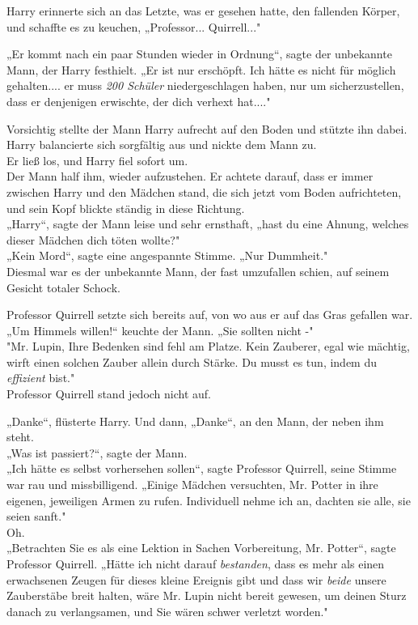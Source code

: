 {Harry erinnerte sich an das Letzte, was er gesehen hatte, den fallenden Körper, und schaffte es zu keuchen, „Professor... Quirrell..."

„Er kommt nach ein paar Stunden wieder in Ordnung“, sagte der unbekannte Mann, der Harry festhielt. „Er ist nur erschöpft. Ich hätte es nicht für möglich gehalten.... er muss \emph{200 Schüler} niedergeschlagen haben, nur um sicherzustellen, dass er denjenigen erwischte, der dich verhext hat...."

Vorsichtig stellte der Mann Harry aufrecht auf den Boden und stützte ihn dabei.\\ Harry balancierte sich sorgfältig aus und nickte dem Mann zu.\\ Er ließ los, und Harry fiel sofort um.\\ Der Mann half ihm, wieder aufzustehen. Er achtete darauf, dass er immer zwischen Harry und den Mädchen stand, die sich jetzt vom Boden aufrichteten, und sein Kopf blickte ständig in diese Richtung.\\ „Harry“, sagte der Mann leise und sehr ernsthaft, „hast du eine Ahnung, welches dieser Mädchen dich töten wollte?"\\ „Kein Mord“, sagte eine angespannte Stimme. „Nur Dummheit."\\ Diesmal war es der unbekannte Mann, der fast umzufallen schien, auf seinem Gesicht totaler Schock.

Professor Quirrell setzte sich bereits auf, von wo aus er auf das Gras gefallen war.\\ „Um Himmels willen!“ keuchte der Mann. „Sie sollten nicht -"\\ "Mr. Lupin, Ihre Bedenken sind fehl am Platze. Kein Zauberer, egal wie mächtig, wirft einen solchen Zauber allein durch Stärke. Du musst es tun, indem du \emph{effizient} bist."\\ Professor Quirrell stand jedoch nicht auf.

„Danke“, flüsterte Harry. Und dann, „Danke“, an den Mann, der neben ihm steht.\\ „Was ist passiert?“, sagte der Mann.\\ „Ich hätte es selbst vorhersehen sollen“, sagte Professor Quirrell, seine Stimme war rau und missbilligend. „Einige Mädchen versuchten, Mr. Potter in ihre eigenen, jeweiligen Armen zu rufen. Individuell nehme ich an, dachten sie alle, sie seien sanft."\\ Oh.\\ „Betrachten Sie es als eine Lektion in Sachen Vorbereitung, Mr. Potter“, sagte Professor Quirrell. „Hätte ich nicht darauf \emph{bestanden}, dass es mehr als einen erwachsenen Zeugen für dieses kleine Ereignis gibt und dass wir \emph{beide} unsere Zauberstäbe breit halten, wäre Mr. Lupin nicht bereit gewesen, um deinen Sturz danach zu verlangsamen, und Sie wären schwer verletzt worden."

}
